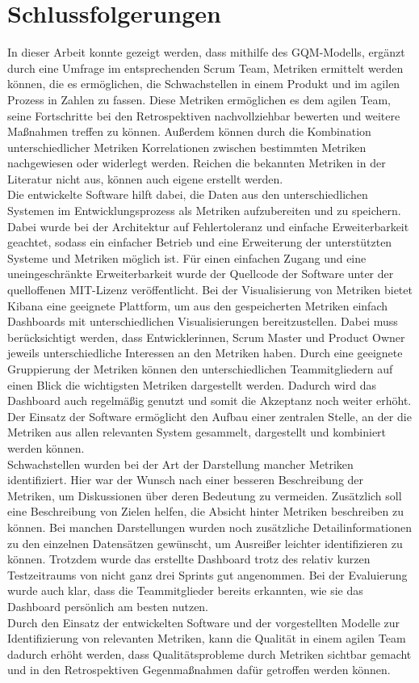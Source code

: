 \chapter{Schlussfolgerungen}

In dieser Arbeit konnte gezeigt werden, dass mithilfe des \ac{GQM}-Modells, ergänzt durch eine Umfrage im entsprechenden Scrum Team, Metriken ermittelt werden können, die es ermöglichen, die Schwachstellen in einem Produkt und im agilen Prozess in Zahlen zu fassen.
Diese Metriken ermöglichen es dem agilen Team, seine Fortschritte bei den Retrospektiven nachvollziehbar bewerten und weitere Maßnahmen treffen zu können.
Außerdem können durch die Kombination unterschiedlicher Metriken Korrelationen zwischen bestimmten Metriken nachgewiesen oder widerlegt werden.
Reichen die bekannten Metriken in der Literatur nicht aus, können auch eigene erstellt werden.
\\
Die entwickelte Software hilft dabei, die Daten aus den unterschiedlichen Systemen im Entwicklungsprozess als Metriken aufzubereiten und zu speichern.
Dabei wurde bei der Architektur auf Fehlertoleranz und einfache Erweiterbarkeit geachtet, sodass ein einfacher Betrieb und eine Erweiterung der unterstützten Systeme und Metriken möglich ist.
Für einen einfachen Zugang und eine uneingeschränkte Erweiterbarkeit wurde der Quellcode der Software unter der quelloffenen MIT-Lizenz veröffentlicht.
Bei der Visualisierung von Metriken bietet Kibana eine geeignete Plattform, um aus den gespeicherten Metriken einfach Dashboards mit unterschiedlichen Visualisierungen bereitzustellen.
Dabei muss berücksichtigt werden, dass Entwicklerinnen, Scrum Master und Product Owner jeweils unterschiedliche Interessen an den Metriken haben.
Durch eine geeignete Gruppierung der Metriken können den unterschiedlichen Teammitgliedern auf einen Blick die wichtigsten Metriken dargestellt werden.
Dadurch wird das Dashboard auch regelmäßig genutzt und somit die Akzeptanz noch weiter erhöht.
Der Einsatz der Software ermöglicht den Aufbau einer zentralen Stelle, an der die Metriken aus allen relevanten System gesammelt, dargestellt und kombiniert werden können.
\\
Schwachstellen wurden bei der Art der Darstellung mancher Metriken identifiziert.
Hier war der Wunsch nach einer besseren Beschreibung der Metriken, um Diskussionen über deren Bedeutung zu vermeiden.
Zusätzlich soll eine Beschreibung von Zielen helfen, die Absicht hinter Metriken beschreiben zu können.
Bei manchen Darstellungen wurden noch zusätzliche Detailinformationen zu den einzelnen Datensätzen gewünscht, um Ausreißer leichter identifizieren zu können.
Trotzdem wurde das erstellte Dashboard trotz des relativ kurzen Testzeitraums von nicht ganz drei Sprints gut angenommen.
Bei der Evaluierung wurde auch klar, dass die Teammitglieder bereits erkannten, wie sie das Dashboard persönlich am besten nutzen.
\\
Durch den Einsatz der entwickelten Software und der vorgestellten Modelle zur Identifizierung von relevanten Metriken, kann die Qualität in einem agilen Team dadurch erhöht werden, dass Qualitätsprobleme durch Metriken sichtbar gemacht und in den Retrospektiven Gegenmaßnahmen dafür getroffen werden können.
